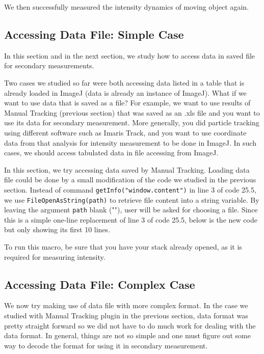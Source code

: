 \documentclass[11pt,a4paper,oneside]{report}
\newcommand{\ilcom}[1]{\texttt{\small#1}}
\begin{document}
We then successfully measured the intensity dynamics of moving object again.  

\newpage
\subsection{Accessing Data File: Simple Case}
In this section and in the next section, we study how to access data in saved file for secondary measurements. 

Two cases we studied so far were both accessing data listed in a table that is already loaded in ImageJ (data is already an instance of ImageJ). What if we want to use data that is saved as a file? For example, we want to use results of Manual Tracking (previous section) that was saved as an .xls file and you want to use its data for secondary measurement. More generally, you did particle tracking using different software such as Imaris Track, and you want to use  coordinate data from that analysis for intensity measurement to be done in ImageJ. In such cases, we should access tabulated data in file accessing from ImageJ. 

In this section, we try accessing data saved by Manual Tracking. Loading data file could be done by a small modification of the code we studied in the previous section. Instead of command \ilcom{getInfo("window.content")} in line 3 of code 25.5, we use \ilcom{FileOpenAsString(path)} to retrieve file content into a string variable.  By leaving the argument \ilcom{path} blank (""), user will be asked for choosing a file. Since this is a simple one-line replacement of line 3 of code 25.5, below is the new code but only showing its first 10 lines.  



To run this macro, be sure that you have your stack already opened, as it is required for measuring intensity. 

\subsection{Accessing Data File: Complex Case}

We now try making use of data file with more complex format. In the case we studied with Manual Tracking plugin in the previous section, data format was pretty straight forward so we did not have to do much work for dealing with the data format. In general, things are not so simple and one must figure out some way to decode the format for using it in secondary measurement. 
\end{document}
